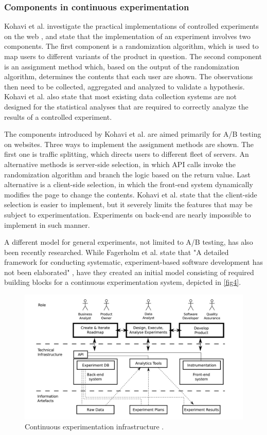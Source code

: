 \documentclass[english]{tktltiki2}
\theoremstyle{definition}
\theoremstyle{remark}
\begin{document}
\subsubsection{Components in continuous experimentation}
Kohavi et al. investigate the practical implementations of controlled experiments on the web \cite{kohavi2007practical}, and state that the implementation of an experiment involves two components. The first component is a randomization algorithm, which is used to map users to different variants of the product in question. The second component is an assignment method which, based on the output of the randomization algorithm, determines the contents that each user are shown. The observations then need to be collected, aggregated and analyzed to validate a hypothesis. Kohavi et al. also state that most existing data collection systems are not designed for the statistical analyses that are required to correctly analyze the results of a controlled experiment.

The components introduced by Kohavi et al. are aimed primarily for A/B testing on websites. Three ways to implement the assignment methods are shown. The first one is traffic splitting, which directs users to different fleet of servers. An alternative methods is server-side selection, in which API calls invoke the randomization algorithm and branch the logic based on the return value. Last alternative is a client-side selection, in which the front-end system dynamically modifies the page to change the contents. Kohavi et al. state that the client-side selection is easier to implement, but it severely limits the features that may be subject to experimentation. Experiments on back-end are nearly impossible to implement in such manner.

A different model for general experiments, not limited to A/B testing, has also been recently researched. While Fagerholm et al. state that "A detailed framework for conducting systematic, experiment-based software development has not been elaborated" \cite{fagerholm2014building}, have they created an initial model consisting of required building blocks for a continuous experimentation system, depicted in \ref{fig4}. 

\begin{figure}[h]
	\centering
	\includegraphics[width=5.0in]{infra.jpg}
	\caption{Continuous experimentation infrastructure \cite{fagerholm2014building}.}
	\label{fig5}
\end{figure}
\end{document}
